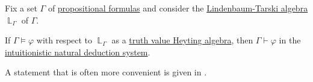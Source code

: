 \begin{theorem}\label{thm:intuitionistic_propositional_completeness}
  Fix a set \( \Gamma \) of \hyperref[def:propositional_syntax/formula]{propositional formulas} and consider the \hyperref[def:lindenbaum_tarski_algebra]{Lindenbaum-Tarski algebra} \( \BbbL_\Gamma \) of \( \Gamma \).

  If \( \Gamma \vDash \varphi \) with respect to \( \BbbL_\Gamma \) as a \hyperref[con:truth_value_algebra]{truth value Heyting algebra}, then \( \Gamma \vdash \varphi \) in the \hyperref[def:propositional_natural_deduction_systems]{intuitionistic natural deduction system}.
\end{theorem}
\begin{comments}
  \item A statement that is often more convenient is given in .
\end{comments}
